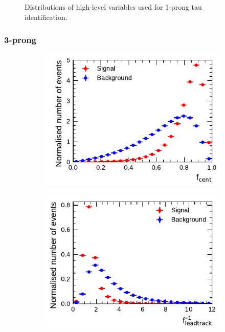 \begin{figure}[htbp]
\begin{subfigure}{0.5\textwidth}
  \end{subfigure}
  \caption[]{Distributions of high-level variables used for 1-prong tau
    identification.}
\end{figure}

\clearpage
\subsubsection{3-prong}

\begin{figure}[htbp]
  \begin{subfigure}{0.5\textwidth}
    \centering
    \includegraphics{./figures/baseline_bdt_vars/3p/centFrac.pdf}
  \end{subfigure}%
  \begin{subfigure}{0.5\textwidth}
    \centering
    \includegraphics{./figures/baseline_bdt_vars/3p/etOverPtLeadTrk.pdf}

\end{subfigure}
\end{figure}
